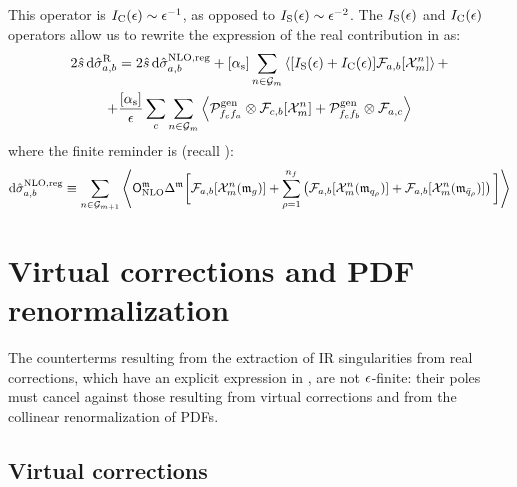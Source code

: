 This operator is $ I_\text{C}(\epsilon) \sim \epsilon^{-1} $, as opposed to $ I_\text{S}(\epsilon) \sim \epsilon^{-2} $. The $ I_\text{S}(\epsilon) $ and $ I_\text{C}(\epsilon) $ operators allow us to rewrite the expression of the real contribution in  as:
\begin{multline}
  2\hat{s}\, \mathrm{d}\hat{\sigma}_{a,b}^\text{R} = 2\hat{s}\, \mathrm{d}\hat{\sigma}_{a,b}^\text{NLO,reg} + [\alpha_\text{s}] \sum_{n \in \mathcal{G}_m} \left\langle [I_\text{S}(\epsilon) + I_\text{C}(\epsilon)] \mathcal{F}_{a,b}[\mathcal{X}^{n}_{m}] \right\rangle + \\
  + \frac{[\alpha_\text{s}]}{\epsilon} \sum_c \sum_{n \in \mathcal{G}_m} \left\langle \mathcal{P}^\text{gen}_{f_c f_a} \otimes \mathcal{F}_{c,b}[\mathcal{X}^{n}_{m}] + \mathcal{P}^\text{gen}_{f_c f_b} \otimes \mathcal{F}_{a,c} \right\rangle
  \label{eq:real-fin}
\end{multline}
where the finite reminder is (recall ):
\begin{equation}
  \mathrm{d}\hat{\sigma}_{a,b}^\text{NLO,reg} \equiv \sum_{n \in \mathcal{G}_{m+1}} \left\langle \mathsf{O}_\text{NLO}^{\mathfrak{m}} \Delta^{\mathfrak{m}} \bigg[ \mathcal{F}_{a,b}[\mathcal{X}^{n}_{m}(\mathfrak{m}_g)] + \sum_{\rho = 1}^{n_f} \left( \mathcal{F}_{a,b}[\mathcal{X}^{n}_{m}(\mathfrak{m}_{q_\rho})] + \mathcal{F}_{a,b}[\mathcal{X}^{n}_{m}(\mathfrak{m}_{\bar{q}_\rho})] \right) \bigg] \right\rangle
\end{equation}

\section{Virtual corrections and PDF renormalization}

The counterterms resulting from the extraction of IR singularities from real corrections, which have an explicit expression in , are not $ \epsilon $-finite: their poles must cancel against those resulting from virtual corrections and from the collinear renormalization of PDFs.

\subsection{Virtual corrections}

